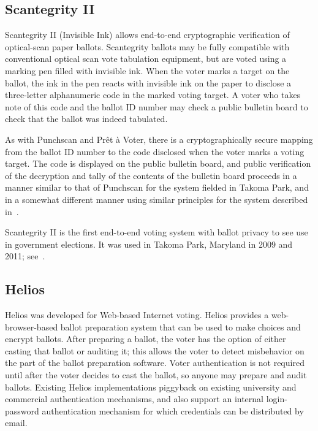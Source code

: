 \subsection{Scantegrity II~\cite{chaum2008,chaum2009}}

Scantegrity II (Invisible Ink) allows end-to-end cryptographic
verification of optical-scan paper ballots.  Scantegrity ballots may
be fully compatible with conventional optical scan vote tabulation
equipment, but are voted using a marking pen filled with invisible
ink.  When the voter marks a target on the ballot, the ink in the pen
reacts with invisible ink on the paper to disclose a three-letter
alphanumeric code in the marked voting target.  A voter who takes note
of this code and the ballot ID number may check a public bulletin
board to check that the ballot was indeed tabulated.

As with Punchscan and Prêt à Voter, there is a cryptographically
secure mapping from the ballot ID number to the code disclosed when
the voter marks a voting target.  The code is displayed on the public
bulletin board, and public verification of the decryption and tally of
the contents of the bulletin board proceeds in a manner similar to
that of Punchscan for the system fielded in Takoma Park, and in a
somewhat different manner using similar principles for the system
described in~\cite{chaum2009}.

Scantegrity II is the first end-to-end voting system with ballot
privacy to see use in government elections.  It was used in Takoma
Park, Maryland in 2009 and 2011; see~\cite{carback2010}.

\subsection{Helios~\cite{adida2008,adida2009}}

Helios was developed for Web-based Internet voting. Helios provides a
web-browser-based ballot preparation system that can be used to make
choices and encrypt ballots.  After preparing a ballot, the voter has
the option of either casting that ballot or auditing it; this allows
the voter to detect misbehavior on the part of the ballot preparation
software. Voter authentication is not required until after the voter
decides to cast the ballot, so anyone may prepare and audit ballots.
Existing Helios implementations piggyback on existing university and
commercial authentication mechanisms, and also support an internal
login-password authentication mechanism for which credentials can be
distributed by email.

